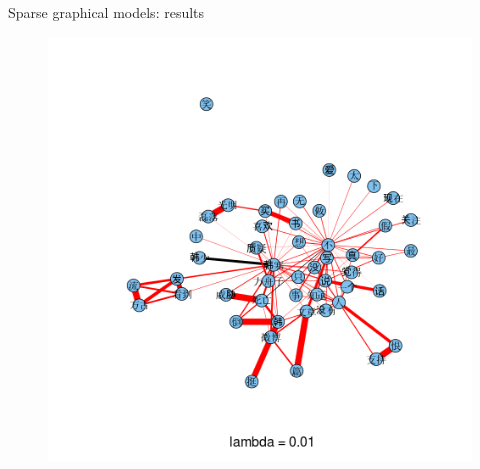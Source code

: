 \documentclass[12pt, trans]{beamer}
\newcommand{\1}[1]{{\mathbf 1}\left\{#1\right\}}        %
\begin{document}
\begin{frame}{Sparse graphical models: results}

\begin{figure}
  \centering
  \includegraphics[height=0.9\textheight]{./../../gLassoResults/glasso1.png} 
\end{figure}

\end{frame}
\end{document}
